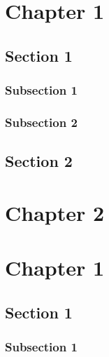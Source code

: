 \documentclass[12pt,b5paper]{cau-thesis} %
\begin{document}
	\makecontents
	\makelist
	\setcounter{page}{1}
    \chapter{Chapter 1}
    
    \section{Section 1}
    
    \subsection{Subsection 1}
    
    \subsection{Subsection 2}
    
    
    \section{Section 2}
    
    
    \chapter{Chapter 2}
    
    \chapter{Chapter 1}
    
    \section{Section 1}
    
    \subsection{Subsection 1}
    
\end{document}
